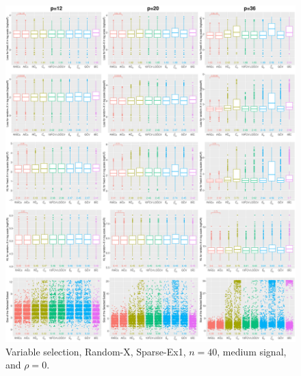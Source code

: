 \begin{figure}[!ht]
\centering
\includegraphics[width=\textwidth]{figures/supplement/randomx/subset_selection/Sparse-Ex1_n40_msnr_rho0.eps}
\caption{Variable selection, Random-X, Sparse-Ex1, $n=40$, medium signal, and $\rho=0$.}
\end{figure}
\clearpage
